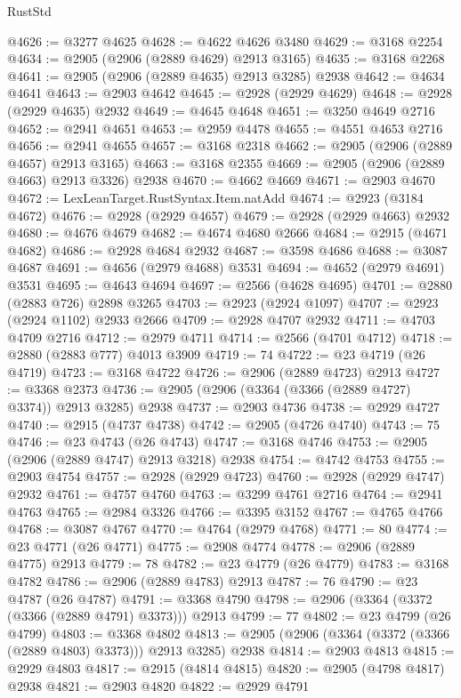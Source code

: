 \begin{lexlean}{RustStd}
\begin{coremodule}
{\begin{coremodule}
{{{{{{{{{{{{{{{{{{{{{{{{{{{{{{{{{{{{{{{{{{{{{{{{{{{{{{{{{{{{{{{{{{{{{{{{{{{{{{@4626 := @3277 @4625
@4628 := @4622 @4626 @3480
@4629 := @3168 @2254
@4634 := @2905 (@2906 (@2889 @4629) @2913 @3165)
@4635 := @3168 @2268
@4641 := @2905 (@2906 (@2889 @4635) @2913 @3285) @2938
@4642 := @4634 @4641
@4643 := @2903 @4642
@4645 := @2928 (@2929 @4629)
@4648 := @2928 (@2929 @4635) @2932
@4649 := @4645 @4648
@4651 := @3250 @4649 @2716
@4652 := @2941 @4651
@4653 := @2959 @4478
@4655 := @4551 @4653 @2716
@4656 := @2941 @4655
@4657 := @3168 @2318
@4662 := @2905 (@2906 (@2889 @4657) @2913 @3165)
@4663 := @3168 @2355
@4669 := @2905 (@2906 (@2889 @4663) @2913 @3326) @2938
@4670 := @4662 @4669
@4671 := @2903 @4670
@4672 := LexLeanTarget.RustSyntax.Item.natAdd
@4674 := @2923 (@3184 @4672)
@4676 := @2928 (@2929 @4657)
@4679 := @2928 (@2929 @4663) @2932
@4680 := @4676 @4679
@4682 := @4674 @4680 @2666
@4684 := @2915 (@4671 @4682)
@4686 := @2928 @4684 @2932
@4687 := @3598 @4686
@4688 := @3087 @4687
@4691 := @4656 (@2979 @4688) @3531
@4694 := @4652 (@2979 @4691) @3531
@4695 := @4643 @4694
@4697 := @2566 (@4628 @4695)
@4701 := @2880 (@2883 @726) @2898 @3265
@4703 := @2923 (@2924 @1097)
@4707 := @2923 (@2924 @1102) @2933 @2666
@4709 := @2928 @4707 @2932
@4711 := @4703 @4709 @2716
@4712 := @2979 @4711
@4714 := @2566 (@4701 @4712)
@4718 := @2880 (@2883 @777) @4013 @3909
@4719 := 74
@4722 := @23 @4719 (@26 @4719)
@4723 := @3168 @4722
@4726 := @2906 (@2889 @4723) @2913
@4727 := @3368 @2373
@4736 := @2905 (@2906 (@3364 (@3366 (@2889 @4727) @3374)) @2913 @3285) @2938
@4737 := @2903 @4736
@4738 := @2929 @4727
@4740 := @2915 (@4737 @4738)
@4742 := @2905 (@4726 @4740)
@4743 := 75
@4746 := @23 @4743 (@26 @4743)
@4747 := @3168 @4746
@4753 := @2905 (@2906 (@2889 @4747) @2913 @3218) @2938
@4754 := @4742 @4753
@4755 := @2903 @4754
@4757 := @2928 (@2929 @4723)
@4760 := @2928 (@2929 @4747) @2932
@4761 := @4757 @4760
@4763 := @3299 @4761 @2716
@4764 := @2941 @4763
@4765 := @2984 @3326
@4766 := @3395 @3152
@4767 := @4765 @4766
@4768 := @3087 @4767
@4770 := @4764 (@2979 @4768)
@4771 := 80
@4774 := @23 @4771 (@26 @4771)
@4775 := @2908 @4774
@4778 := @2906 (@2889 @4775) @2913
@4779 := 78
@4782 := @23 @4779 (@26 @4779)
@4783 := @3168 @4782
@4786 := @2906 (@2889 @4783) @2913
@4787 := 76
@4790 := @23 @4787 (@26 @4787)
@4791 := @3368 @4790
@4798 := @2906 (@3364 (@3372 (@3366 (@2889 @4791) @3373))) @2913
@4799 := 77
@4802 := @23 @4799 (@26 @4799)
@4803 := @3368 @4802
@4813 := @2905 (@2906 (@3364 (@3372 (@3366 (@2889 @4803) @3373))) @2913 @3285) @2938
@4814 := @2903 @4813
@4815 := @2929 @4803
@4817 := @2915 (@4814 @4815)
@4820 := @2905 (@4798 @4817) @2938
@4821 := @2903 @4820
@4822 := @2929 @4791
}}}}}}}}}}}}}}}}}}}}}}}}}}}}}}}}}}}}}}}}}}}}}}}}}}}}}}}}}}}}}}}}}}}}}}}}}}}}}}
\end{coremodule}}
\end{coremodule}
\end{lexlean}
